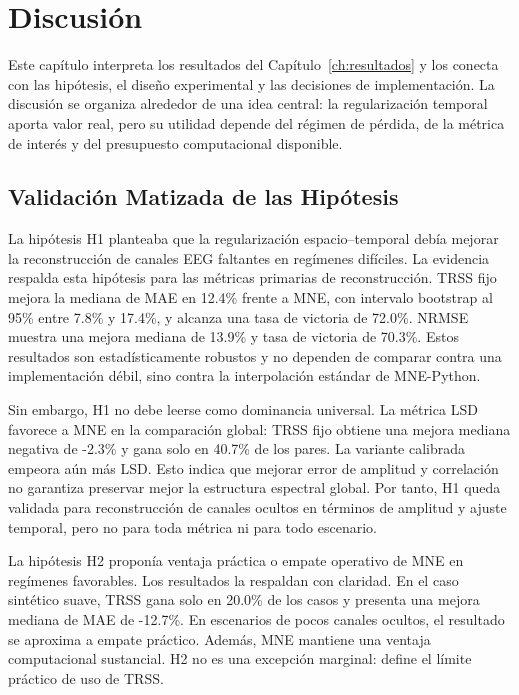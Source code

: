 \chapter{Discusión}
\label{ch:discusion}

Este capítulo interpreta los resultados del Capítulo~\ref{ch:resultados} y los conecta con las hipótesis, el diseño experimental y las decisiones de implementación. La discusión se organiza alrededor de una idea central: la regularización temporal aporta valor real, pero su utilidad depende del régimen de pérdida, de la métrica de interés y del presupuesto computacional disponible.

\section{Validación Matizada de las Hipótesis}

La hipótesis H1 planteaba que la regularización espacio--temporal debía mejorar la reconstrucción de canales EEG faltantes en regímenes difíciles. La evidencia respalda esta hipótesis para las métricas primarias de reconstrucción. TRSS fijo mejora la mediana de MAE en 12.4\% frente a MNE, con intervalo bootstrap al 95\% entre 7.8\% y 17.4\%, y alcanza una tasa de victoria de 72.0\%. NRMSE muestra una mejora mediana de 13.9\% y tasa de victoria de 70.3\%. Estos resultados son estadísticamente robustos y no dependen de comparar contra una implementación débil, sino contra la interpolación estándar de MNE-Python.

Sin embargo, H1 no debe leerse como dominancia universal. La métrica LSD favorece a MNE en la comparación global: TRSS fijo obtiene una mejora mediana negativa de -2.3\% y gana solo en 40.7\% de los pares. La variante calibrada empeora aún más LSD. Esto indica que mejorar error de amplitud y correlación no garantiza preservar mejor la estructura espectral global. Por tanto, H1 queda validada para reconstrucción de canales ocultos en términos de amplitud y ajuste temporal, pero no para toda métrica ni para todo escenario.

La hipótesis H2 proponía ventaja práctica o empate operativo de MNE en regímenes favorables. Los resultados la respaldan con claridad. En el caso sintético suave, TRSS gana solo en 20.0\% de los casos y presenta una mejora mediana de MAE de -12.7\%. En escenarios de pocos canales ocultos, el resultado se aproxima a empate práctico. Además, MNE mantiene una ventaja computacional sustancial. H2 no es una excepción marginal: define el límite práctico de uso de TRSS.

